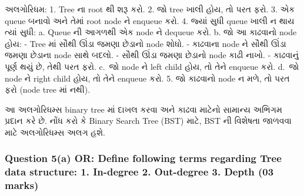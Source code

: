 અલગોરિધમ: 1. Tree ના root થી શરૂ કરો. 2. જો tree ખાલી હોય, તો પરત ફરો. 3.
એક queue બનાવો અને તેમાં root node ને enqueue કરો. 4. જ્યાં સુધી queue ખાલી ન
થાય ત્યાં સુધી: a. Queue ની આગળથી એક node ને dequeue કરો. b. જો આ કાઢવાનો
node હોય: - Tree માં સૌથી ઊંડા જમણા છેડાનો node શોધો. - કાઢવાના node ને સૌથી
ઊંડા જમણા છેડાના node સાથે બદલો. - સૌથી ઊંડા જમણા છેડાનો node કાઢી નાખો. -
કાઢવાનું પૂર્ણ થયું છે, તેથી પરત ફરો. c.~જો node ને left child હોય, તો તેને enqueue
કરો. d.~જો node ને right child હોય, તો તેને enqueue કરો. 5. જો કાઢવાનો node
ન મળે, તો પરત ફરો (node tree માં નથી).

\begin{Shaded}
\begin{Highlighting}[]
\end{Highlighting}
\end{Shaded}

આ અલગોરિધમ્સ binary tree માં દાખલ કરવા અને કાઢવા માટેનો સામાન્ય અભિગમ પ્રદાન
કરે છે. નોંધ કરો કે Binary Search Tree (BST) માટે, BST ની વિશેષતા જાળવવા માટે
અલગોરિધમ્સ અલગ હશે.

\hypertarget{question-5a-or-define-following-terms-regarding-tree-data-structure-1.-in-degree-2.-out-degree-3.-depth-03-marks}{%
\subsubsection{Question 5(a) OR: Define following terms regarding Tree
data structure: 1. In-degree 2. Out-degree 3. Depth (03
marks)}\label{question-5a-or-define-following-terms-regarding-tree-data-structure-1.-in-degree-2.-out-degree-3.-depth-03-marks}}

